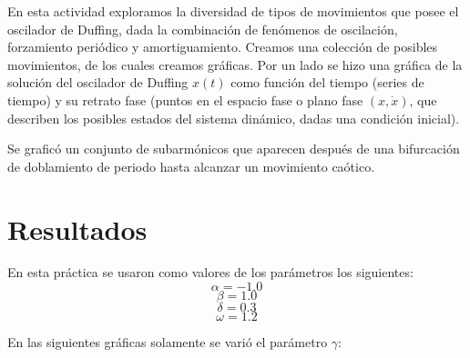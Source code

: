 \documentclass{article}
\begin{document}
En esta actividad exploramos la diversidad de tipos de movimientos que posee el oscilador de Duffing, dada la combinación de fenómenos de oscilación, forzamiento periódico y amortiguamiento. Creamos una colección de posibles movimientos, de los cuales creamos gráficas. Por un lado se hizo una gráfica de la solución del oscilador de Duffing $x(t)$ como función del tiempo (series de tiempo) y su retrato fase (puntos en el espacio fase o plano fase $(x, \dot x)$, que describen los posibles estados del sistema dinámico, dadas una condición inicial).

Se graficó un conjunto de subarmónicos que aparecen después de una bifurcación de doblamiento de periodo hasta alcanzar un movimiento caótico. 
\clearpage

\section{Resultados}
En esta práctica se usaron como valores de los parámetros los siguientes:
$$\alpha = -1.0$$ $$\beta = 1.0$$ $$\delta = 0.3$$ $$\omega = 1.2$$

En las siguientes gráficas solamente se varió el parámetro $\gamma$:
\end{document}
